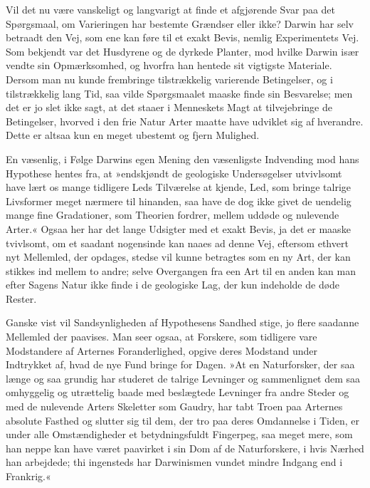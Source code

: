 \documentclass[12pt,a4paper]{article}
\begin{document}
Vil det nu være vanskeligt og langvarigt at finde et afgjørende Svar
paa det Spørgsmaal, om Varieringen har bestemte Grændser eller ikke?
Darwin har selv betraadt den Vej, som ene kan føre til et exakt Bevis,
nemlig Experimentets Vej. Som bekjendt var det Husdyrene og de dyrkede
Planter, mod hvilke Darwin især vendte sin Opmærksomhed, og hvorfra han
hentede sit vigtigste Materiale. Dersom man nu kunde frembringe
tilstrækkelig varierende Betingelser, og i tilstrækkelig lang Tid, saa
vilde Spørgsmaalet maaske finde sin Besvarelse; men det er jo slet ikke
sagt, at det staaer i Menneskets Magt at tilvejebringe de Betingelser,
hvorved i den frie Natur Arter maatte have udviklet sig af hverandre.
Dette er altsaa kun en meget ubestemt og fjern Mulighed.

En væsenlig, i Følge Darwins egen Mening den væsenligste Indvending mod
hans Hypothese hentes fra, at »endskjøndt de geologiske Undersøgelser
utvivlsomt have lært os mange tidligere Leds Tilværelse at kjende, Led,
som bringe talrige Livsformer meget nærmere til hinanden, saa have de
dog ikke givet de uendelig mange fine Gradationer, som Theorien fordrer,
mellem uddøde og nulevende Arter.« Ogsaa her har det lange Udsigter med
et exakt Bevis, ja det er maaske tvivlsomt, om et saadant nogensinde kan
naaes ad denne Vej, eftersom ethvert nyt Mellemled, der opdages, stedse
vil kunne betragtes som en ny Art, der kan stikkes ind mellem to andre;
selve Overgangen fra een Art til en anden kan man efter Sagens Natur ikke
finde i de geologiske Lag, der kun indeholde de døde Rester.

Ganske vist vil Sandsynligheden af Hypothesens Sandhed stige, jo flere
saadanne Mellemled der paavises. Man seer ogsaa, at Forskere, som
tidligere vare Modstandere af Arternes Foranderlighed, opgive deres
Modstand under Indtrykket af, hvad de nye Fund bringe for Dagen. »At en
Naturforsker, der saa længe og saa grundig har studeret de talrige
Levninger og sammenlignet dem saa omhyggelig og utrættelig baade med
beslægtede Levninger fra andre Steder og med de nulevende Arters Skeletter
som Gaudry, har tabt Troen paa Arternes absolute Fasthed og slutter sig
til dem, der tro paa deres Omdannelse i Tiden, er under alle
Omstændigheder et betydningsfuldt Fingerpeg, saa meget mere, som han
neppe kan have været paavirket i sin Dom af de Naturforskere, i hvis
Nærhed han arbejdede; thi ingensteds har Darwinismen vundet mindre Indgang
end i Frankrig.«
\end{document}
